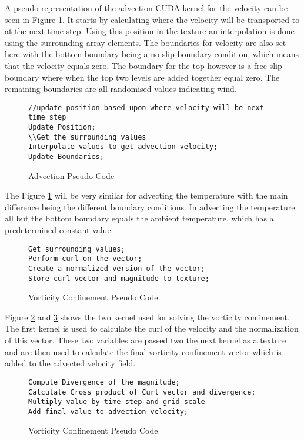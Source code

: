 A pseudo representation of the advection CUDA kernel for the velocity can be seen in Figure \ref{sc:AdvectionPseudoCode}.
It starts by calculating where the velocity will be transported to at the next time step.
Using this position in the texture an interpolation is done using the surrounding array elements.
The boundaries for velocity are also set here with the bottom boundary being a no-slip boundary condition, which means that the velocity equals zero.
The boundary for the top however is a free-slip boundary where when the top two levels are added together equal zero.
The remaining boundaries are all randomised values indicating wind. 

\begin{figure}[h]
\centering
\begin{lstlisting}
//update position based upon where velocity will be next time step
Update Position;
\\Get the surrounding values
Interpolate values to get advection velocity;	
Update Boundaries;
\end{lstlisting}
\caption{Advection Pseudo Code}
\label{sc:AdvectionPseudoCode}
\end{figure}

The Figure \ref{sc:AdvectionPseudoCode} will be very similar for advecting the temperature with the main difference being the different boundary conditions.
In advecting the temperature all but the bottom boundary equals the ambient temperature, which has a predetermined constant value.

\begin{figure}[h]
\centering
\begin{lstlisting}
Get surrounding values;
Perform curl on the vector;
Create a normalized version of the vector;
Store curl vector and magnitude to texture; 
\end{lstlisting}
\caption{Vorticity Confinement Pseudo Code}
\label{sc:vorticity confinement_one}
\end{figure}

Figure \ref{sc:vorticity confinement_one} and \ref{sc:vorticity confinement_two} shows the two kernel used for solving the vorticity confinement.
The first kernel is used to calculate the curl of the velocity and the normalization of this vector.
These two variables are passed two the next kernel as a texture and are then used to calculate the final vorticity confinement vector which is added to the advected velocity field.

\begin{figure}[h]
\centering
\begin{lstlisting}
Compute Divergence of the magnitude;
Calculate Cross product of Curl vector and divergence;
Multiply value by time step and grid scale
Add final value to advection velocity;
\end{lstlisting}
\caption{Vorticity Confinement Pseudo Code}
\label{sc:vorticity confinement_two}
\end{figure}

